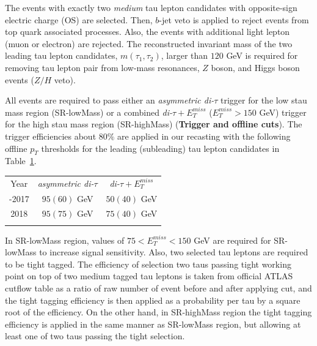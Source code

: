 \documentclass{ws-mpla}
\begin{document}
The events with exactly two \textit{medium} tau lepton candidates with opposite-sign electric charge (OS) are selected. 
Then, $b$-jet veto is applied to reject events from top quark associated processes.
Also, the events with additional light lepton (muon or electron) are rejected.
The reconstructed invariant mass of the two leading tau lepton candidates, $m(\tau_1,\tau_2)$, larger than $120$ GeV is required for removing tau lepton pair from low-mass resonances, $Z$ boson, and Higgs boson events ($Z/H$ veto).

All events are required to pass either an \textit{asymmetric di-$\tau$} trigger for the low stau mass region (SR-lowMass) or a combined \textit{di-$\tau +E^{miss}_T$} ($E^{miss}_T > 150$ GeV) trigger for the high stau mass region (SR-highMass) (\textbf{Trigger and offline cuts}).
The trigger efficiencies about $80\%$ are applied in our recasting with the following offline $p_T$ thresholds for the leading (subleading) tau lepton candidates in Table~\ref{tab:trig-eff}.

\begin{table}[h!]
  {\begin{tabular}{@{}c c c@{}} \toprule
  Year & \textit{asymmetric di-$\tau$} & \textit{di-$\tau +E^{miss}_T$} \\
  \colrule
 2015-2017 & $95(60)$ GeV & $50(40)$ GeV \\
 2018 & $95(75)$ GeV & $75(40)$ GeV \\ 
  \botrule
  \end{tabular}\label{tab:trig-eff} }
\end{table}

In SR-lowMass region, values of $75 < E^{miss}_T < 150$ GeV are required for SR-lowMass to increase signal sensitivity.
Also, two selected tau leptons are required to be tight tagged.
The efficiency of selection two taus passing tight working point on top of two medium tagged tau leptons is taken from official ATLAS cutflow table as a ratio of raw number of event before and after applying cut, and the tight tagging efficiency is then applied as a probability per tau by a square root of the efficiency.
On the other hand, in SR-highMass region the tight tagging efficiency is applied in the same manner as SR-lowMass region, but allowing at least one of two taus passing the tight selection.
\end{document}
